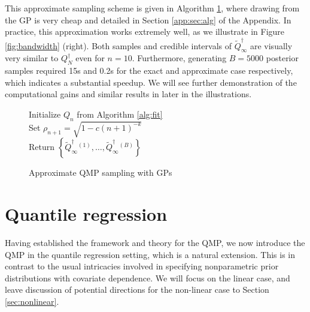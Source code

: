 \documentclass[11pt,a4paper]{article}
\begin{document}
This approximate sampling scheme is given in {Algorithm \ref{alg:approx_QMP}}, where drawing from the GP is very cheap and detailed in Section \ref{app:sec:alg} of the Appendix. In practice, this approximation works extremely well, as we illustrate in {Figure \ref{fig:bandwidth} (right)}. Both samples and credible intervals of $\widetilde{Q}_\infty^{\dagger}$ are visually very similar to $Q_N^{\dagger}$ even for $n = 10$. Furthermore, generating $B = 5000$ posterior samples required 15s and 0.2s for the exact and approximate case respectively, which indicates a substantial speedup. We will see further demonstration of the computational gains and similar results in later in the illustrations. \vspace{2mm}
\begin{figure}[ht]
\center
\small
 \begin{minipage}{.57\linewidth}
\begin{algorithm}[H]
{Initialize $Q_n$ from {Algorithm \ref{alg:fit}}\\}
{Set $\rho_{n+1} = \sqrt{1- c(n+1)^{-k}}$\\}
 {Return $\left\{{\widetilde{Q}_\infty^{\dagger}}{}^{(1)},\ldots,{{\widetilde{Q}}_\infty^{\dagger}}{}^{(B)}\right\}$}
\caption{Approximate QMP sampling with GPs }\label{alg:approx_QMP}
\end{algorithm}\vspace{-2mm}
\end{minipage}

\end{figure}

\section{Quantile regression}\label{sec:quantreg}

Having established the framework and theory for the QMP, we now introduce the QMP in the quantile regression setting, which is a natural extension. This is in contrast to the usual intricacies involved in specifying nonparametric prior distributions with covariate dependence. We will focus on the linear case, and leave discussion of potential directions for the non-linear case to Section \ref{sec:nonlinear}.
\end{document}
